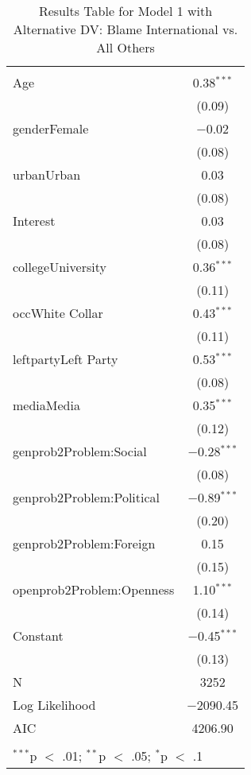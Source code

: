 
\begin{table}[!htbp] \centering 
  \caption{Results Table for Model 1 with Alternative DV: Blame International vs. All Others} 
  \label{} 
\footnotesize 
\begin{tabular}{@{\extracolsep{5pt}}lc} 
\\[-1.8ex]\hline \\[-1.8ex] 
\hline \\[-1.8ex] 
 Age & 0.38$^{***}$ \\ 
  & (0.09) \\ 
  genderFemale & $-$0.02 \\ 
  & (0.08) \\ 
  urbanUrban & 0.03 \\ 
  & (0.08) \\ 
  Interest & 0.03 \\ 
  & (0.08) \\ 
  collegeUniversity & 0.36$^{***}$ \\ 
  & (0.11) \\ 
  occWhite Collar & 0.43$^{***}$ \\ 
  & (0.11) \\ 
  leftpartyLeft Party & 0.53$^{***}$ \\ 
  & (0.08) \\ 
  mediaMedia & 0.35$^{***}$ \\ 
  & (0.12) \\ 
  genprob2Problem:Social & $-$0.28$^{***}$ \\ 
  & (0.08) \\ 
  genprob2Problem:Political & $-$0.89$^{***}$ \\ 
  & (0.20) \\ 
  genprob2Problem:Foreign & 0.15 \\ 
  & (0.15) \\ 
  openprob2Problem:Openness & 1.10$^{***}$ \\ 
  & (0.14) \\ 
  Constant & $-$0.45$^{***}$ \\ 
  & (0.13) \\ 
 N & 3252 \\ 
Log Likelihood & $-$2090.45 \\ 
AIC & 4206.90 \\ 
\hline \\[-1.8ex] 
\multicolumn{2}{l}{$^{***}$p $<$ .01; $^{**}$p $<$ .05; $^{*}$p $<$ .1} \\ 
\end{tabular} 
\end{table} 
